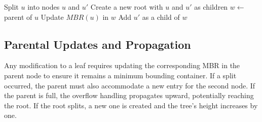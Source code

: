 \documentclass[a4paper, 10pt, titlepage]{report}
\begin{document}
\begin{algorithm}
\caption{Handle Overflow}\label{alg:insertion}
\begin{algorithmic}[1]
    \State Split $u$ into nodes $u$ and $u'$
        \State Create a new root with $u$ and $u'$ as children
    \Else
        \State $w \gets$ parent of $u$
        \State Update $MBR(u)$ in $w$
        \State Add $u'$ as a child of $w$
            \State {}
        \EndIf
    \EndIf
\EndProcedure
\end{algorithmic}
\end{algorithm}

\subsection{Parental Updates and Propagation}
Any modification to a leaf requires updating the corresponding MBR in the parent node to ensure it remains a minimum bounding container. If a split occurred, the parent must also accommodate a new entry for the second node. If the parent is full, the overflow handling propagates upward, potentially reaching the root. If the root splits, a new one is created and the tree's height increases by one.
\end{document}
